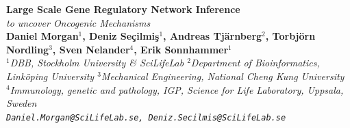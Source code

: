 \documentclass[a0,portrait]{a0poster}
\begin{document}


\begin{minipage}[b]{0.75\linewidth}
\veryHuge \color{NavyBlue} \textbf{Large Scale Gene Regulatory Network Inference} \color{Black}\\ %
\Huge\textit{to uncover Oncogenic Mechanisms}\\[2cm] %
\huge \textbf{ Daniel Morgan$^1$, Deniz Seçilmiş$^1$, Andreas Tj\"{a}rnberg$^2$, Torbj\"{o}rn  Nordling$^3$, Sven Nelander$^4$, Erik Sonnhammer$^1$ } \\[0.1cm]
\large $^1$\it {DBB, Stockholm University \& SciLifeLab} $^2$\it{Department of Bioinformatics, Link\"{o}ping University} $^3$\it {Mechanical Engineering, National Cheng Kung University} $^4$\it {Immunology, genetic and pathology, IGP, Science for Life Laboratory, Uppsala, Sweden
}\\[0.4cm]
\Large \texttt{Daniel.Morgan@SciLifeLab.se, Deniz.Secilmis@SciLifeLab.se}
\end{minipage}
%

\vspace{1cm} %

\end{document}
